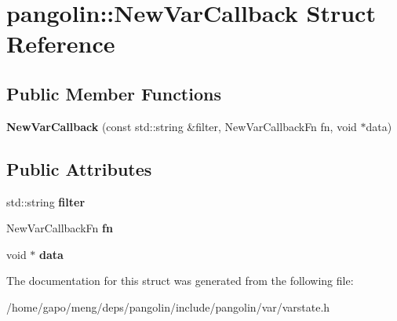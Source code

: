 \hypertarget{structpangolin_1_1_new_var_callback}{}\section{pangolin\+:\+:New\+Var\+Callback Struct Reference}
\label{structpangolin_1_1_new_var_callback}
\subsection*{Public Member Functions}
\begin{DoxyCompactItemize}
\item 
{\bfseries New\+Var\+Callback} (const std\+::string \&filter, New\+Var\+Callback\+Fn fn, void $\ast$data)\hypertarget{structpangolin_1_1_new_var_callback_af65ff1828148da0910a794b3a9230295}{}\label{structpangolin_1_1_new_var_callback_af65ff1828148da0910a794b3a9230295}

\end{DoxyCompactItemize}
\subsection*{Public Attributes}
\begin{DoxyCompactItemize}
\item 
std\+::string {\bfseries filter}\hypertarget{structpangolin_1_1_new_var_callback_a5bb6fadcd45ce9bb6ff5c418064d122d}{}\label{structpangolin_1_1_new_var_callback_a5bb6fadcd45ce9bb6ff5c418064d122d}

\item 
New\+Var\+Callback\+Fn {\bfseries fn}\hypertarget{structpangolin_1_1_new_var_callback_a6cc6dc2abb4c03e7f4f05b4ac245d4bb}{}\label{structpangolin_1_1_new_var_callback_a6cc6dc2abb4c03e7f4f05b4ac245d4bb}

\item 
void $\ast$ {\bfseries data}\hypertarget{structpangolin_1_1_new_var_callback_a2c5a89ad64d6226e26d256bc86cb53f9}{}\label{structpangolin_1_1_new_var_callback_a2c5a89ad64d6226e26d256bc86cb53f9}

\end{DoxyCompactItemize}


The documentation for this struct was generated from the following file\+:\begin{DoxyCompactItemize}
\item 
/home/gapo/meng/deps/pangolin/include/pangolin/var/varstate.\+h\end{DoxyCompactItemize}
